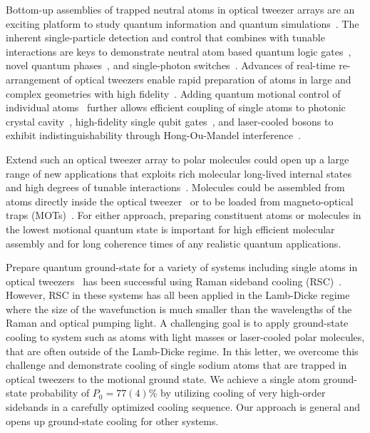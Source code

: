 \documentclass[aps,prl,twocolumn,groupedaddress]{revtex4-1}
\begin{document}
Bottom-up assemblies of trapped neutral atoms in optical tweezer arrays
are an exciting platform to study quantum information and quantum simulations~\cite{Schlosser2001,Weiss2004,Isenhower2010,Wilk2010,Kaufman2015,Labuhn2016,Murmann2015}.
The inherent single-particle detection and control that combines with tunable interactions
are keys to demonstrate neutral atom based quantum logic gates~\cite{Isenhower2010,Wilk2010},
novel quantum phases~\cite{Labuhn2016}, and single-photon switches~\cite{Dayan2008,Tiecke2014}.
Advances of real-time re-arrangement of optical tweezers enable rapid preparation of atoms
in large and complex geometries with high fidelity~\cite{Barredo2016,Endres2016}.
Adding quantum motional control of individual
atoms~\cite{Li2012,Kaufman2012,Thompson2013,Liu2017,Robens2017} further allows
efficient coupling of single atoms to photonic crystal cavity~\cite{Thompson2013a},
high-fidelity single qubit gates~\cite{Wang2016},
and laser-cooled bosons to exhibit indistinguishability
through Hong-Ou-Mandel interference~\cite{Kaufman2014}.

Extend such an optical tweezer array to polar molecules could open up a large range of
new applications that exploits rich molecular long-lived internal states
and high degrees of tunable interactions~\cite{DeMille2002,Ni2008,Gorshkov2011,Yan2013}.
Molecules could be assembled from atoms directly inside the optical tweezer~\cite{Liu2017}
or to be loaded from magneto-optical traps
(MOTs)~\cite{Barry2014,Truppe2017SubDoppler,Anderegg2017}.
For either approach, preparing constituent atoms or molecules in the lowest motional
quantum state is important for high efficient molecular assembly
and for long coherence times of any realistic quantum applications.

Prepare quantum ground-state for a variety of systems including
single atoms in optical tweezers~\cite{Kaufman2012,Thompson2013,Liu2017,Robens2017}
has been successful using Raman sideband cooling (RSC)~\cite{Monroe1995,Kerman2000,Han2000}.
However, RSC in these systems has all been applied in the Lamb-Dicke regime where
the size of the wavefunction is much smaller than the wavelengths of
the Raman and optical pumping light.
A challenging goal is to apply ground-state cooling to system such as atoms with light masses
or laser-cooled polar molecules, that are often outside of the Lamb-Dicke regime.
In this letter, we overcome this challenge and demonstrate cooling of single sodium atoms
that are trapped in optical tweezers to the motional ground state.
We achieve a single atom ground-state probability of $P_0=77(4)$\% by utilizing cooling of
very high-order sidebands in a carefully optimized cooling sequence.
Our approach is general and opens up ground-state cooling for other systems.
\end{document}
